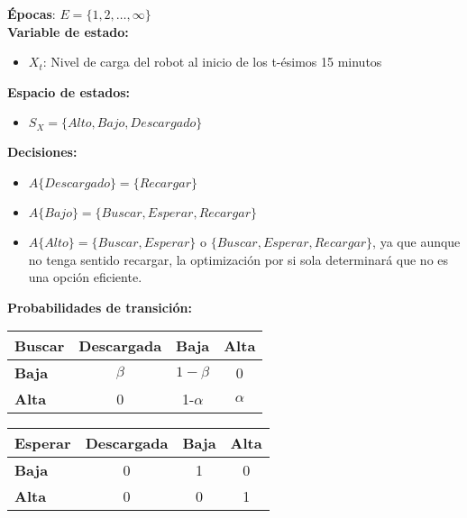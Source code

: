 \begin{enumerate}[label=\alph*.]
\noindent \textbf{Épocas}: $E=\{1,2,\dots, \infty\}$ \\
\textbf{Variable de estado:}
    \begin{itemize}
        \item[] $X_t$: Nivel de carga del robot al inicio de los t-ésimos 15 minutos
    \end{itemize}
\textbf{Espacio de estados:}
    \begin{itemize}
        \item[] $S_X=\{Alto, Bajo, Descargado\}$ 
    \end{itemize}
\textbf{Decisiones:}
    \begin{itemize}
        \item[] $A\{Descargado\}=\{Recargar\}$
        \item[] $A\{Bajo\}=\{Buscar, Esperar, Recargar\}$
        \item[] $A\{Alto\}=\{Buscar, Esperar\}$ o $\{Buscar, Esperar, Recargar\}$, ya que aunque no tenga sentido recargar, la optimización por si sola determinará que no es una opción eficiente.
    \end{itemize}
\textbf{Probabilidades de transición:}
    \begin{table}[H]
    \centering
    \begin{tabular}{|l|c|c|c|}
    \hline
    \textbf{Buscar}     & \textbf{Descargada} & \textbf{Baja} & \textbf{Alta} \\ \hline   
    \textbf{Baja} & $\beta$   & $1-\beta$     & 0        \\ \hline              
    \textbf{Alta} & 0     & 1-$\alpha$      & $\alpha$           \\ \hline  
    \end{tabular}
    \end{table}
    \begin{table}[H]
    \centering
    \begin{tabular}{|l|c|c|c|}
    \hline
    \textbf{Esperar}     & \textbf{Descargada} & \textbf{Baja} & \textbf{Alta} \\ \hline   
    \textbf{Baja} & 0   & 1    & 0        \\ \hline              
    \textbf{Alta} & 0     & 0     & 1          \\ \hline  
    \end{tabular}
    \end{table}
    \begin{table}[H]
    \centering
    \begin{tabular}{|l|c|c|c|}

\end{tabular}
\end{table}
\end{enumerate}

